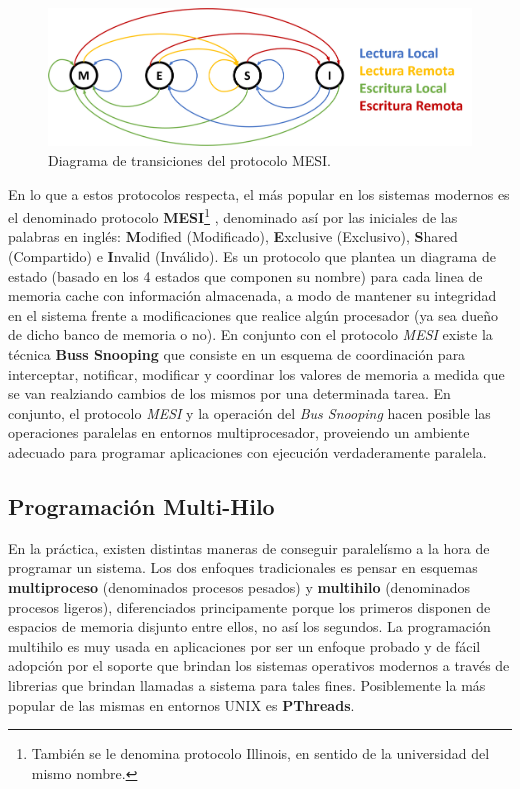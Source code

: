 \begin{figure}[!h]
	\centering
	\includegraphics[scale=0.3]{imagenes/MESI.png}
	\caption{Diagrama de transiciones del protocolo MESI.}
	\label{fig:MESI}
\end{figure}

En lo que a estos protocolos respecta, el más popular en los sistemas modernos es el denominado protocolo \textbf{MESI}\footnote{También se le denomina protocolo Illinois, en sentido de la universidad del mismo nombre.} \cite{paper:MESI}, denominado así por las iniciales de las palabras en inglés: \textbf{M}odified (Modificado), \textbf{E}xclusive (Exclusivo), \textbf{S}hared (Compartido) e \textbf{I}nvalid (Inválido). Es un protocolo que plantea un diagrama de estado (basado en los 4 estados que componen su nombre) para cada linea de memoria cache con información almacenada, a modo de mantener su integridad en el sistema frente a modificaciones que realice algún procesador (ya sea dueño de dicho banco de memoria o no). En conjunto con el protocolo \emph{MESI} existe la técnica \textbf{Buss Snooping} \cite{paper:snoop} que consiste en un esquema de coordinación para interceptar, notificar, modificar y coordinar los valores de memoria a medida que se van realziando cambios de los mismos por una determinada tarea. En conjunto, el protocolo \emph{MESI} y la operación del \emph{Bus Snooping} hacen posible las operaciones paralelas en entornos multiprocesador, proveiendo un ambiente adecuado para programar aplicaciones con ejecución verdaderamente paralela.

\subsection{Programación Multi-Hilo}
En la práctica, existen distintas maneras de conseguir paralelísmo a la hora de programar un sistema. Los dos enfoques tradicionales es pensar en esquemas \textbf{multiproceso} (denominados procesos pesados) y \textbf{multihilo} (denominados procesos ligeros), diferenciados principamente porque los primeros disponen de espacios de memoria disjunto entre ellos, no así los segundos. La programación multihilo es muy usada en aplicaciones por ser un enfoque probado y de fácil adopción por el soporte que brindan los sistemas operativos modernos a través de librerias que brindan llamadas a sistema para tales fines. Posiblemente la más popular de las mismas en entornos UNIX es \textbf{PThreads}.

